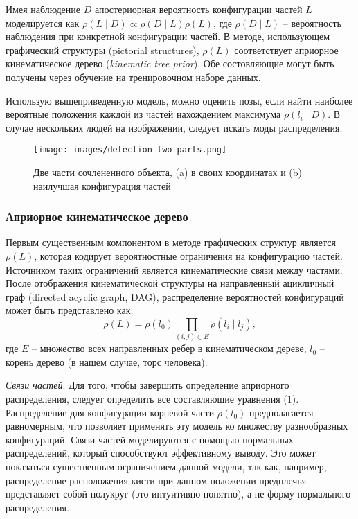 Имея наблюдение \(D\) апостериорная вероятность конфигурации частей \(L\) моделируется как \(\rho(L{\mid}D)\propto\rho(D{\mid}L)\rho(L)\), где \(\rho(D{\mid}L)\) -- вероятность наблюдения при конкретной конфигурации частей. В методе, использующем графический структуры (pictorial structures), \(\rho(L)\) соответствует априорное кинематическое дерево (\emph{kinematic tree prior}). Обе состовляющие могут быть получены через обучение на тренировочном наборе данных.

Использую вышеприведенную модель, можно оценить позы, если найти наиболее вероятные положения каждой из частей нахождением максимума \(\rho(l_i{\mid}D)\). В случае нескольких людей на изображении, следует искать моды распределения.

\begin{figure}
  \centering
  \texttt{[image: images/detection-two-parts.png]}
  \caption{Две части сочлененного объекта, (a) в своих координатах и (b) наилучшая конфигурация частей\label{detection-two-parts}}
\end{figure}

\subsubsection{Априорное кинематическое дерево}

Первым существенным компонентом в методе графических структур является \(\rho(L)\), которая кодирует вероятностные ограничения на конфигурацию частей. Источником таких ограничений является кинематические связи между частями. После отображения кинематической структуры на направленный ацикличный граф (directed acyclic graph, DAG), распределение вероятностей конфигураций может быть представлено как:
\begin{equation}
  \rho(L) = \rho(l_0)\prod_{(i,j){\in}E}\rho(l_i{\mid}l_j),
\end{equation}
где \(E\) -- множество всех направленных ребер в кинематическом дереве, \(l_0\) -- корень дерево (в нашем случае, торс человека).

\emph{Связи частей}. Для того, чтобы завершить определение априорного распределения, следует определить все составляющие уравнения (1). Распределение для конфигурации корневой части \(\rho(l_0)\) предполагается равномерным, что позволяет применять эту модель ко множеству разнообразных конфигураций. Связи частей моделируются с помощью нормальных распределений, который способствуют эффективному выводу. Это может показаться существенным ограничением данной модели, так как, например, распределение расположения кисти при данном положении предплечья представляет собой полукруг (это интуитивно понятно), а не форму нормального распределения.

